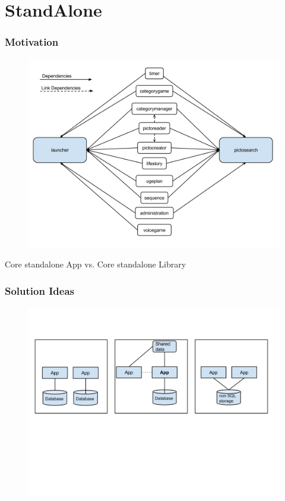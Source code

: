 \section{StandAlone}
\begin{frame}
	\frametitle{Motivation}
	\begin{figure}[H]
				\centering
				\includegraphics[width= 0.8 \textwidth]{pictures/AppAppdependencies.png}
	\end{figure}
	Core standalone App vs. Core standalone Library
\end{frame}
\begin{frame}
	\frametitle{Solution Ideas}
	\begin{figure}[H]
				\centering
				\includegraphics[width= 0.8 \textwidth]{pictures/Corelib.png}
	\end{figure}
\end{frame}
